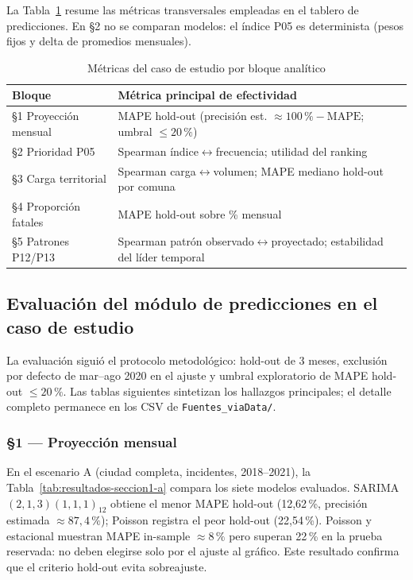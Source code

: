 \clearpage

La Tabla~\ref{tab:caso-estudio-metricas} resume las métricas transversales empleadas en el tablero de predicciones. En §2 no se comparan modelos: el índice P05 es determinista (pesos fijos y delta de promedios mensuales).

\begin{table}[H]
	\centering
	\caption{Métricas del caso de estudio por bloque analítico}
	\label{tab:caso-estudio-metricas}
	\small
	\begin{tabularx}{\linewidth}{@{}l X@{}}
		\toprule
		\textbf{Bloque} & \textbf{Métrica principal de efectividad} \\
		\midrule
		§1 Proyección mensual & MAPE hold-out (precisión est. $\approx 100\,\% - \mathrm{MAPE}$; umbral $\leq 20\,\%$) \\
		§2 Prioridad P05 & Spearman índice$\leftrightarrow$frecuencia; utilidad del ranking \\
		§3 Carga territorial & Spearman carga$\leftrightarrow$volumen; MAPE mediano hold-out por comuna \\
		§4 Proporción fatales & MAPE hold-out sobre \% mensual \\
		§5 Patrones P12/P13 & Spearman patrón observado$\leftrightarrow$proyectado; estabilidad del líder temporal \\
		\bottomrule
	\end{tabularx}
\end{table}

\subsection{Evaluación del módulo de predicciones en el caso de estudio}

La evaluación siguió el protocolo metodológico: hold-out de 3 meses, exclusión por defecto de mar--ago 2020 en el ajuste y umbral exploratorio de MAPE hold-out $\leq 20\,\%$. Las tablas siguientes sintetizan los hallazgos principales; el detalle completo permanece en los CSV de \texttt{Fuentes\_viaData/}.

\subsubsection{§1 — Proyección mensual}

En el escenario A (ciudad completa, incidentes, 2018--2021), la Tabla~\ref{tab:resultados-seccion1-a} compara los siete modelos evaluados. SARIMA$(2,1,3)(1,1,1)_{12}$ obtiene el menor MAPE hold-out (12,62\,\%, precisión estimada $\approx 87{,}4\,\%$); Poisson registra el peor hold-out (22,54\,\%). Poisson y estacional muestran MAPE in-sample $\approx 8\,\%$ pero superan 22\,\% en la prueba reservada: no deben elegirse solo por el ajuste al gráfico. Este resultado confirma que el criterio hold-out evita sobreajuste.


